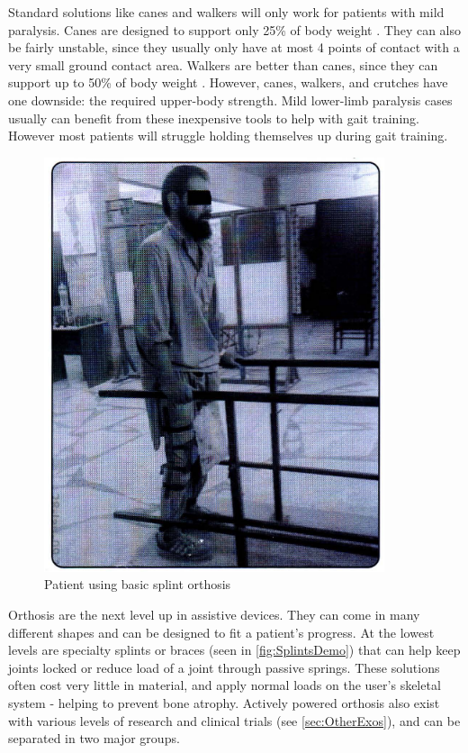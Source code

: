 Standard solutions like canes and walkers will only work for patients with mild paralysis. Canes are designed to support only 25\% of body weight \cite{RehabParaplegia}. They can also be fairly unstable, since they usually only have at most 4 points of contact with a very small ground contact area. Walkers are better than canes, since they can support up to 50\% of body weight \cite{RehabParaplegia}. However, canes, walkers, and crutches have one downside: the required upper-body strength. Mild lower-limb paralysis cases usually can benefit from these inexpensive tools to help with gait training. However most patients will struggle holding themselves up during gait training.

\begin{figure} [ht!]
    \centering
    \includegraphics[width=0.4\linewidth]{Figures/Background/SplintsDemo.png}
    \caption{Patient using basic splint orthosis \cite{RehabParaplegia}}
    \label{fig:SplintsDemo}
\end{figure}

Orthosis are the next level up in assistive devices. They can come in many different shapes and can be designed to fit a patient's progress. At the lowest levels are specialty splints or braces (seen in \autoref{fig:SplintsDemo}) that can help keep joints locked or reduce load of a joint through passive springs. These solutions often cost very little in material, and apply normal loads on the user's skeletal system - helping to prevent bone atrophy. Actively powered orthosis also exist with various levels of research and clinical trials (see \autoref{sec:OtherExos}), and can be separated in two major groups. 

